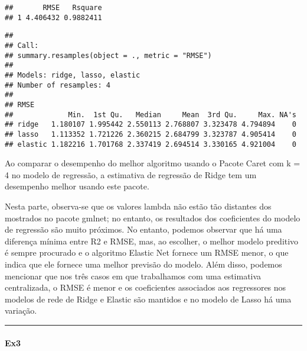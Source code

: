 \documentclass[]{article}
\newenvironment{Shaded}{\begin{snugshade}}{\end{snugshade}}
\newcommand{\DataTypeTok}[1]{\textcolor[rgb]{0.13,0.29,0.53}{#1}}
\newcommand{\KeywordTok}[1]{\textcolor[rgb]{0.13,0.29,0.53}{\textbf{#1}}}
\newcommand{\NormalTok}[1]{#1}
\newcommand{\OperatorTok}[1]{\textcolor[rgb]{0.81,0.36,0.00}{\textbf{#1}}}
\newcommand{\StringTok}[1]{\textcolor[rgb]{0.31,0.60,0.02}{#1}}
\let\oldparagraph\paragraph
\renewcommand{\paragraph}[1]{\oldparagraph{#1}\mbox{}}
\begin{document}
\begin{verbatim}
##       RMSE   Rsquare
## 1 4.406432 0.9882411
\end{verbatim}

\begin{Shaded}
\end{Shaded}

\begin{verbatim}
## 
## Call:
## summary.resamples(object = ., metric = "RMSE")
## 
## Models: ridge, lasso, elastic 
## Number of resamples: 4 
## 
## RMSE 
##             Min.  1st Qu.   Median     Mean  3rd Qu.     Max. NA's
## ridge   1.180107 1.995442 2.550113 2.768807 3.323478 4.794894    0
## lasso   1.113352 1.721226 2.360215 2.684799 3.323787 4.905414    0
## elastic 1.182216 1.701768 2.337419 2.694514 3.330165 4.921004    0
\end{verbatim}

Ao comparar o desempenho do melhor algoritmo usando o Pacote Caret com k
= 4 no modelo de regressão, a estimativa de regressão de Ridge tem um
desempenho melhor usando este pacote.

Nesta parte, observa-se que os valores lambda não estão tão distantes
dos mostrados no pacote gmlnet; no entanto, os resultados dos
coeficientes do modelo de regressão são muito próximos. No entanto,
podemos observar que há uma diferença mínima entre R2 e RMSE, mas, ao
escolher, o melhor modelo preditivo é sempre procurado e o algoritmo
Elastic Net fornece um RMSE menor, o que indica que ele fornece uma
melhor previsão do modelo. Além disso, podemos mencionar que nos três
casos em que trabalhamos com uma estimativa centralizada, o RMSE é menor
e os coeficientes associados aos regressores nos modelos de rede de
Ridge e Elastic são mantidos e no modelo de Lasso há uma variação.

\begin{center}\rule{0.5\linewidth}{0.5pt}\end{center}

\hypertarget{ex3}{%
\paragraph{Ex3}\label{ex3}}
\end{document}
